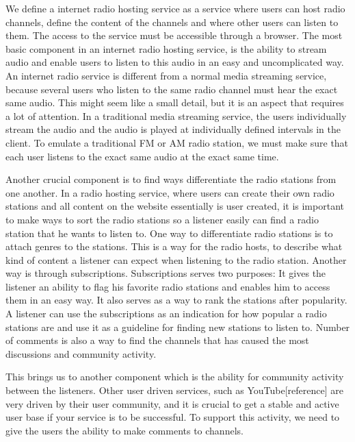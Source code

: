 \documentclass[a4paper,11pt,report]{article}
\begin{document}
{We define a internet radio hosting service as a service where users can host radio channels, define the content of the channels and where other users can listen to them. The access to the service must be accessible through a browser. The most basic component in an internet radio hosting service, is the ability to stream audio and enable users to listen to this audio in an easy and uncomplicated way. An internet radio service is different from a normal media streaming service, because several users who listen to the same radio channel must hear the exact same audio. This might seem like a small detail, but it is an aspect that requires a lot of attention. In a traditional media streaming service, the users individually stream the audio and the audio is played at individually defined intervals in the client. To emulate a traditional FM or AM radio station, we must make sure that each user listens to the exact same audio at the exact same time. 

Another crucial component is to find ways differentiate the radio stations from one another. In a radio hosting service, where users can create their own radio stations and all content on the website essentially is user created, it is important to make ways to sort the radio stations so a listener easily can find a radio station that he wants to listen to. One way to differentiate radio stations is to attach genres to the stations. This is a way for the radio hosts, to describe what kind of content a listener can expect when listening to the radio station. Another way is through subscriptions. Subscriptions serves two purposes: It gives the listener an ability to flag his favorite radio stations and enables him to access them in an easy way. It also serves as a way to rank the stations after popularity. A listener can use the subscriptions as an indication for how popular a radio stations are and use it as a guideline for finding new stations to listen to. Number of comments is also a way to find the channels that has caused the most discussions and community activity. 

This brings us to another component which is the ability for community activity between the listeners. Other user driven services, such as YouTube[reference] are very driven by their user community, and it is crucial to get a stable and active user base if your service is to be successful. To support this activity, we need to give the users the ability to make comments to channels.

}
\end{document}
